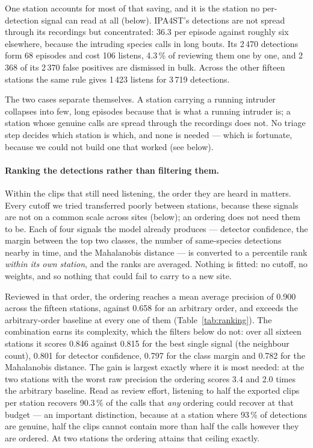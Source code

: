 \documentclass[review,3p,times]{elsarticle}
\begin{document}
One station accounts for most of that saving, and it is the station no
per-detection signal can read at all (below). IPA4ST's detections are not
spread through its recordings but concentrated: 36.3 per
episode against roughly six elsewhere, because the intruding species calls in
long bouts. Its 2\,470 detections form 68 episodes and cost 106 listens, 4.3\,\%
of reviewing them one by one, and 2\,368 of its 2\,370 false positives are
dismissed in bulk. Across the other fifteen stations the same rule gives 1\,423
listens for 3\,719 detections.

The two cases separate themselves. A station carrying a running intruder
collapses into few, long episodes because that is what a running intruder is; a
station whose genuine calls are spread through the recordings does not. No
triage step decides which station is which, and none is needed --- which is
fortunate, because we could not build one that worked (see below).

\paragraph{Ranking the detections rather than filtering them.}
Within the clips that still need listening, the order they are heard in
matters. Every cutoff we tried transferred poorly between stations, because
these signals are not on a common scale across sites (below); an ordering does
not need them to be. Each of four signals the model already produces --- detector confidence,
the margin between the top two classes, the number of same-species detections
nearby in time, and the Mahalanobis distance --- is converted to a percentile
rank \emph{within its own station}, and the ranks are averaged. Nothing is
fitted: no cutoff, no weights, and so nothing that could fail to carry to a new
site.

Reviewed in that order, the ordering reaches a mean average precision of 0.900
across the fifteen stations, against 0.658 for an arbitrary order, and exceeds
the arbitrary-order baseline at every one of them (Table~\ref{tab:ranking}).
The combination earns its complexity, which the filters below do not: over all
sixteen stations it scores 0.846 against 0.815 for the best single signal (the
neighbour count), 0.801 for detector confidence, 0.797 for the class margin and
0.782 for the Mahalanobis distance.
The gain is largest exactly where it is most needed: at the two stations with
the worst raw precision the ordering scores 3.4 and 2.0 times the arbitrary
baseline. Read as review effort, listening to half the exported clips per
station recovers 90.3\,\% of the calls that \emph{any} ordering could recover
at that budget --- an important distinction, because at a station where 93\,\%
of detections are genuine, half the clips cannot contain more than half the
calls however they are ordered. At two stations the ordering attains that
ceiling exactly.
\end{document}
